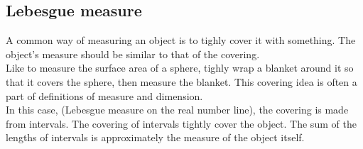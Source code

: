 \documentclass[11pt]{ekblite}
\begin{document}
\subsection{Lebesgue measure}
A common way of measuring an object is to tighly cover it with something. The object's measure should be similar to that of the covering.
\\[0.2in]Like to measure the surface area of a sphere, tighly wrap a blanket around it so that it covers the sphere, then measure the blanket. This covering idea is often a part of definitions of measure and dimension.
\\[0.2in]In this case, (Lebesgue measure on the real number line), the covering is made from intervals. The covering of intervals tightly cover the object. The sum of the lengths of intervals is approximately the measure of the object itself.
\begin{definition}
	
\end{definition}

\newpage
\end{document}
